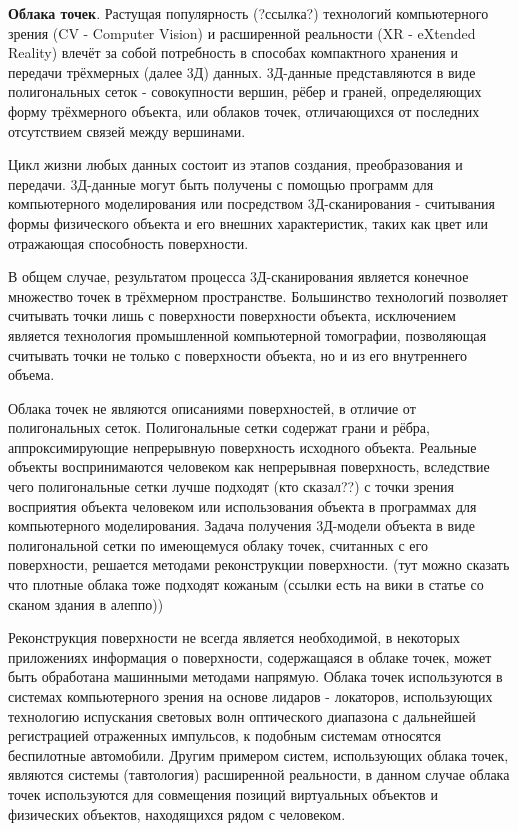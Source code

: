 \textbf{Облака точек}. Растущая популярность (?ссылка?) технологий компьютерного
зрения (CV - Computer Vision) и расширенной реальности (XR - eXtended Reality)
влечёт за собой потребность в способах компактного хранения и передачи
трёхмерных (далее 3Д) данных. 3Д-данные представляются в виде полигональных
сеток - совокупности вершин, рёбер и граней, определяющих форму трёхмерного
объекта, или облаков точек, отличающихся от последних отсутствием связей между
вершинами.

Цикл жизни любых данных состоит из этапов создания, преобразования и передачи.
3Д-данные могут быть получены с помощью программ для компьютерного моделирования
или посредством 3Д-сканирования - считывания формы физического объекта и его
внешних характеристик, таких как цвет или отражающая способность поверхности.

В общем случае, результатом процесса 3Д-сканирования является конечное множество
точек в трёхмерном пространстве\cite[10]{SurfaceReconstruction}. Большинство
технологий позволяет считывать точки лишь с поверхности поверхности объекта,
исключением является технология промышленной компьютерной томографии,
позволяющая считывать точки не только с поверхности объекта, но и из его
внутреннего объема.

Облака точек не являются описаниями поверхностей, в отличие от полигональных
сеток. Полигональные сетки содержат грани и рёбра, аппроксимирующие непрерывную
поверхность исходного объекта. Реальные объекты воспринимаются человеком как
непрерывная поверхность, вследствие чего полигональные сетки лучше подходят (кто
сказал??) с точки зрения восприятия объекта человеком или использования объекта
в программах для компьютерного моделирования. Задача получения 3Д-модели объекта
в виде полигональной сетки по имеющемуся облаку точек, считанных с его
поверхности, решается методами реконструкции
поверхности\cite{SurfaceReconstruction}. (тут можно сказать что плотные облака
тоже подходят кожаным (ссылки есть на вики в статье со сканом здания в алеппо))

Реконструкция поверхности не всегда является необходимой, в некоторых
приложениях информация о поверхности, содержащаяся в облаке точек, может быть
обработана машинными методами напрямую. Облака точек используются в системах
компьютерного зрения на основе лидаров - локаторов, использующих технологию
испускания световых волн оптического диапазона с дальнейшей регистрацией
отраженных импульсов, к подобным системам относятся беспилотные
автомобили\cite[7]{PointCloudAnalysis}. Другим примером систем, использующих
облака точек, являются системы (тавтология) расширенной реальности, в данном
случае облака точек используются для совмещения позиций виртуальных объектов и
физических объектов, находящихся рядом с человеком\cite[15]{PointCloudAnalysis}.

